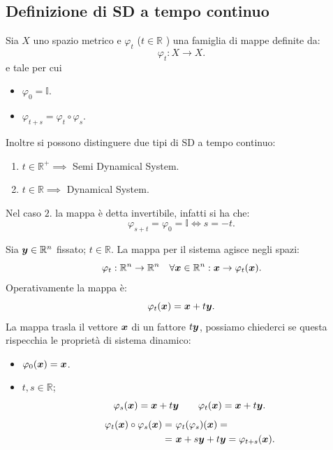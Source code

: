 \subsection{Definizione di SD a tempo continuo}%
\label{sub:Definizione di SD a tempo continuo}
\begin{defn}
    Sia $X$ uno spazio metrico e $\varphi_t$ ($t \in \mathbb{R}$ ) una famiglia di mappe definite da:
    \[
	\varphi_t: X\to X
    .\] 
    e tale per cui
    \begin{itemize}
	\item $\varphi_0 = \mathbb{I}$.
	\item $\varphi_{t+s}=\varphi_t \circ \varphi_s$.
    \end{itemize}
    Inoltre si possono distinguere due tipi di SD a tempo continuo:
    \begin{enumerate}
        \item $t\in \mathbb{R}^+ \implies$ Semi Dynamical System.
        \item $t\in \mathbb{R} \implies$ Dynamical System.
    \end{enumerate}
    Nel caso $2.$ la mappa è detta invertibile, infatti si ha che:
    \[
        \varphi_{s+t} = \varphi_0 = \mathbb{I} \iff s = -t
    .\] 
\end{defn}
\noindent
\begin{exmp}[Traslazione]
    Sia $\boldsymbol{y}\in \mathbb{R}^n$ fissato; $t\in \mathbb{R}$. La mappa per il sistema agisce negli spazi:
    \[
	\varphi_t: \mathbb{R}^n \to \mathbb{R}^n \quad \forall \boldsymbol{x} \in \mathbb{R}^n: \boldsymbol{x}  \to \varphi_t(\boldsymbol{x})
    .\] 
    Operativamente la mappa è:
    \[
	\varphi_t(\boldsymbol{x}) = \boldsymbol{x} + t\boldsymbol{y}
    .\] 
    La mappa trasla il vettore $\boldsymbol{x}$ di un fattore $t\boldsymbol{y}$, possiamo chiederci se questa rispecchia le proprietà di sistema dinamico:
    \begin{itemize}
	\item $\varphi_0(\boldsymbol{x})= \boldsymbol{x}$.
	\item $t, s \in \mathbb{R}$; 
	    \[
		\varphi_s(\boldsymbol{x}) = \boldsymbol{x}  + t\boldsymbol{y}  \qquad \varphi_t(\boldsymbol{x}) = \boldsymbol{x}  + t\boldsymbol{y}
	    .\] 
	    \[\begin{aligned}
		\varphi_t(\vect{x}) \circ \varphi_s(\vect{x}) =& \ \varphi_t(\varphi_s)(\vect{x}) = \\
							       =& \ \vect{x} + s\vect{y} + t\vect{y} = \varphi_{t+s}(\vect{x})
	    .\end{aligned}\]
    \end{itemize}
\end{exmp}
\noindent
